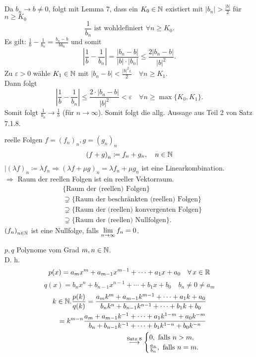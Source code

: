 \documentclass[../ana1.tex]{subfiles}
\begin{document}
\begin{bew}
\begin{enumerate}
		Da \(b_n \rightarrow b \neq 0\), folgt mit Lemma 7, dass ein \(K_0\in\mathbb{N} \) existiert mit \(|b_n| >\frac{|b|}{2} \) für \(n\geq K_0\) 
		\[\frac{1}{b_n} \text{ ist wohldefiniert } \forall n\geq K_0.\]
		Es gilt: \( \frac{1}{b} - \frac{1}{b_n} = \frac{b_n - b}{b b_n} \) und somit 
		\[ \left| \frac{1}{b} - \frac{1}{b_n} \right| = \frac{|b_n-b|}{|b| \cdot |b_n|} \leq \frac{2 |b_n - b|}{|b|^2}. \]
		Zu \(\varepsilon >0 \) wähle \(K_1 \in \mathbb{N} \) mit \(|b_n - b| < \frac{|b|^2\varepsilon}{2} \quad \forall n\geq K_1 \).\\
		Dann folgt 
		\[ \left| \frac{1}{b} - \frac{1}{b_n} \right| \leq \frac{2 \cdot |b_n - b|}{|b|^2} < \varepsilon \quad \forall n\geq\max \{ K_0,K_1\}. \]
		Somit folgt \( \frac{1}{b_n} \rightarrow \frac{1}{b} \) (für \(n\rightarrow \infty \)). Somit folgt die allg. Aussage aus Teil 2 von Satz 7.1.8.
	\end{enumerate}
\end{bew}

reelle Folgen \(f = {(f_n)}_n, g = {(g_n)}_n  \) \\
\[ {(f+g)}_n \coloneqq f_n + g_n, \quad n\in\mathbb{N} \]
\(|{(\lambda f)}_n \coloneqq \lambda f_n \Rightarrow {(\lambda f + \mu g)}_n = \lambda f_n + \mu g_n \) ist eine Linearkombination.\\
\(\Rightarrow{}\) Raum der reellen Folgen ist ein reeller Vektorraum.
\begin{align*}
	&\{ \text{Raum der (reellen) Folgen} \} \\
	&\supsetneq \{ \text{Raum der beschränkten (reellen) Folgen} \} \\
	&\supsetneq \{ \text{Raum der (reellen) konvergenten Folgen} \} \\
	&\supsetneq \{ \text{Raum der (reellen) Nullfolgen} \}.
\end{align*}
\({(f_n)}_{n\in\mathbb{N}}\) ist eine Nullfolge, falls \( \lim\limits_{n\rightarrow\infty} f_n = 0 \).

\begin{bsp}[1]
	\( p,q \) Polynome vom Grad \(m,n\in\mathbb{N} \).\\
	D. h. \[ p(x) = a_m x^m + a_{m-1} x^{m-1} + \cdots + a_1 x + a_0 \quad \forall x\in\R \]
	\[q(x) = b_n x^n + b_{n-1} x^{n-1} + \cdots + b_1 x + b_0 \quad b_n \neq 0 \neq a_m \]
	\begin{align*}
		k\in\mathbb{N}. \frac{p(k)}{q(k)} = \frac{a_m k^m + a_{m-1} k^{m-1} + \cdots + a_1 k + a_0}{b_n k^n + b_{n-1} k^{n-1} + \cdots + b_1 k + b_0}\\
		= k^{m-n} \frac{a_m + a_{m-1} k^{-1} + \cdots + a_1 k^{1-m} + a_0 k^{-m} }{b_n + b_{n-1} k^{-1} + \cdots + b_1 k^{1-n} + b_0 k^{-n}}\\
		\overset{\text{Satz 8}}{\longrightarrow}
		\begin{cases}
			0, \text{ falls } n>m.\\
			\frac{a_n}{b_n}, \text{ falls } n = m.
		\end{cases}
	\end{align*}
\end{bsp}
\end{document}
